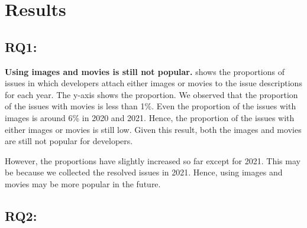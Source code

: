 \section{Results}
\label{sec:results}



% 


\subsection{RQ1: \RQone{}}



\textbf{Using images and movies is still not popular.}
 shows the proportions of 
issues in which developers attach either 
images or movies to the issue descriptions for each year. 
The y-axis shows the proportion. 
We observed that the proportion of the issues 
with movies is less than 1\%. 
Even the proportion of the issues with images is 
around 6\% in 2020 and 2021. 
Hence, the proportion of the issues with either 
images or movies is still low. 
Given this result, both the images and movies are still 
not popular for developers. 

However, the proportions have slightly increased so far 
except for 2021. 
This may be because we collected the resolved issues 
in 2021. 
Hence, using images and movies may be more popular in the future. 


\subsection{RQ2: \RQtwo{}}

